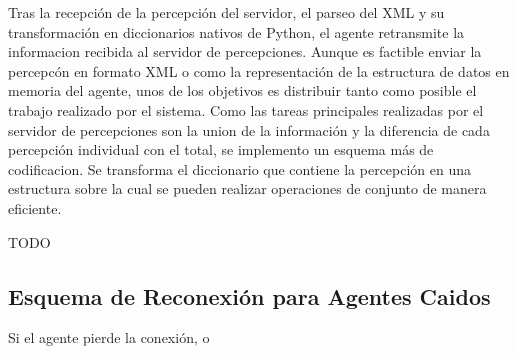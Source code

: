 Tras la recepción de la percepción del servidor, el parseo del XML y
su transformación en diccionarios nativos de Python, el agente
retransmite la informacion recibida al servidor de percepciones.
Aunque es factible enviar la percepcón en formato XML o como la
representación de la estructura de datos en memoria del agente, unos
de los objetivos es distribuir tanto como posible el trabajo realizado
por el sistema.
Como las tareas principales realizadas por el servidor de percepciones 
son la union de la información y la diferencia de cada percepción 
individual con el total, se implemento un esquema más de codificacion. 
Se transforma el diccionario que contiene la percepción en una 
estructura sobre la cual se pueden realizar operaciones de conjunto de 
manera eficiente. 
 
TODO

\subsection{Esquema de Reconexión para Agentes Caidos}

Si el agente pierde la conexión, o 
